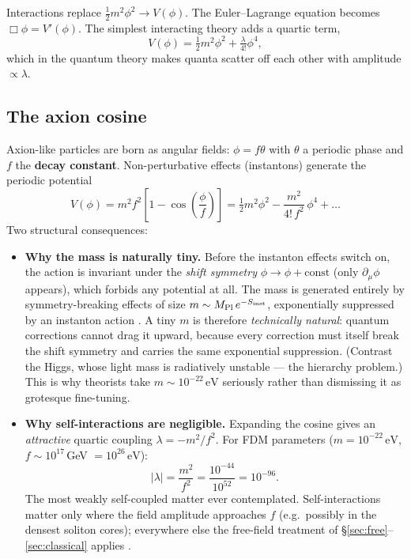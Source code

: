 \documentclass[12pt]{article}
\newcommand{\eV}{\,\mathrm{eV}}
\begin{document}
Interactions replace $\tfrac{1}{2}m^2\phi^2 \to V(\phi)$.  The
Euler--Lagrange equation becomes $\Box\phi = V'(\phi)$.  The simplest
interacting theory adds a quartic term,
%
\begin{equation}
  V(\phi) = \tfrac{1}{2}m^2\phi^2 + \tfrac{\lambda}{4!}\phi^4,
\end{equation}
%
which in the quantum theory makes quanta scatter off each other with
amplitude $\propto\lambda$.

\subsection{The axion cosine}
\label{sec:axion}

Axion-like particles are born as angular fields: $\phi = f\theta$
with $\theta$ a periodic phase and $f$ the \textbf{decay constant}.
Non-perturbative effects (instantons) generate the periodic
potential
%
\begin{equation}
  V(\phi) = m^2 f^2 \left[ 1 - \cos\!\left(\frac{\phi}{f}\right)
            \right]
          = \tfrac{1}{2}m^2\phi^2
            - \frac{m^2}{4!\,f^2}\,\phi^4 + \dots
  \label{eq:axion_potential}
\end{equation}
%
Two structural consequences:
%
\begin{itemize}
  \item \textbf{Why the mass is naturally tiny.}  Before the
        instanton effects switch on, the action is invariant under
        the \emph{shift symmetry} $\phi \to \phi + \mathrm{const}$
        (only $\partial_\mu\phi$ appears), which forbids any
        potential at all.  The mass is generated entirely by
        symmetry-breaking effects of size $m \sim M_{\rm Pl}\,
        e^{-S_{\rm inst}}$, exponentially suppressed by an instanton
        action \citep{Arvanitaki2010}.  A tiny $m$ is therefore
        \emph{technically natural}: quantum corrections cannot drag
        it upward, because every correction must itself break the
        shift symmetry and carries the same exponential suppression.
        (Contrast the Higgs, whose light mass is radiatively
        unstable --- the hierarchy problem.)  This is why theorists
        take $m \sim 10^{-22}\eV$ seriously rather than dismissing
        it as grotesque fine-tuning.
  \item \textbf{Why self-interactions are negligible.}  Expanding the
        cosine gives an \emph{attractive} quartic coupling
        $\lambda = -m^2/f^2$.  For FDM parameters
        ($m = 10^{-22}\eV$, $f \sim 10^{17}\,$GeV $= 10^{26}\eV$):
        \begin{equation}
          |\lambda| = \frac{m^2}{f^2}
            = \frac{10^{-44}}{10^{52}} = 10^{-96}.
        \end{equation}
        The most weakly self-coupled matter ever contemplated.
        Self-interactions matter only where the field amplitude
        approaches $f$ (e.g.\ possibly in the densest soliton
        cores); everywhere else the free-field treatment of
        \S\ref{sec:free}--\ref{sec:classical} applies
        \citep{Hui2017, Marsh2016}.
\end{itemize}
\end{document}
